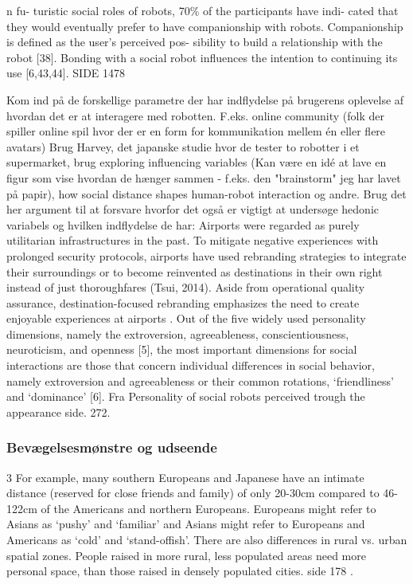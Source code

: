  n fu- turistic social roles of robots, 70\% of the participants have indi- cated that they would eventually prefer to have companionship with robots. Companionship is defined as the user’s perceived pos- sibility to build a relationship with the robot [38]. Bonding with a social robot influences the intention to continuing its use [6,43,44]. SIDE 1478










Kom ind på de forskellige parametre der har indflydelse på brugerens oplevelse af hvordan det er at interagere med robotten. F.eks. online community (folk der spiller online spil hvor der er en form for kommunikation mellem én eller flere avatars) \blankline
%
Brug Harvey, det japanske studie hvor de tester to robotter i et supermarket, brug exploring influencing variables (Kan være en idé at lave en figur som vise hvordan de hænger sammen - f.eks. den "brainstorm" jeg har lavet på papir), how social distance shapes human-robot interaction og andre. \blankline
%
%
Brug det her argument til at forsvare hvorfor det også er vigtigt at undersøge hedonic variabels og hvilken indflydelse de har: Airports were regarded as purely utilitarian infrastructures in the past. To mitigate negative experiences with prolonged security protocols, airports have used rebranding strategies to integrate their surroundings or to become reinvented as destinations in their own right instead of just thoroughfares (Tsui, 2014). Aside from operational quality assurance, destination-focused rebranding emphasizes the need to create enjoyable experiences at airports \textcite[s. 352]{PDF:TheImpactOfTraveler}.\blankline
%
Out of the five widely used personality dimensions, namely the extroversion, agreeableness, conscientiousness, neuroticism, and openness [5], the most important dimensions for social interactions are those that concern individual differences in social behavior, namely extroversion and agreeableness or their common rotations, ‘friendliness’ and ‘dominance’ [6]. Fra Personality of social robots perceived trough the appearance side. 272.

\subsubsection{Bevægelsesmønstre og udseende}
\label{InteraktionSocialeRobotterParametreBevaegelsesmoenstre}
%


3 For example, many southern Europeans and Japanese have an intimate distance (reserved for close friends and family) of only 20-30cm compared to 46-122cm of the Americans and northern Europeans. Europeans might refer to Asians as ‘pushy’ and ‘familiar’ and Asians might refer to Europeans and Americans as ‘cold’ and ‘stand-offish’. There are also differences in rural vs. urban spatial zones. People raised in more rural, less populated areas need more personal space, than those raised in densely populated cities. side 178 \textcite[s. 178]{PDF:HowMayIServeYou}.

